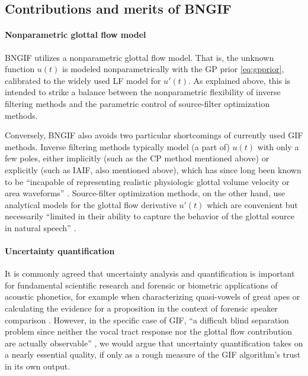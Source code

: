 \begin{chaptersections}
\subsection{Contributions and merits of BNGIF}

\paragraph{Nonparametric glottal flow model}
BNGIF utilizes a nonparametric glottal flow model.
That is, the unknown function $u(t)$ is modeled nonparametrically with the GP prior \eqref{eq:gpprior}, calibrated to the widely used LF model for $u'(t)$.
As explained above, this is intended to strike a balance between the nonparametric flexibility of inverse filtering methods and the parametric control of source-filter optimization methods.

Conversely, BNGIF also avoids two particular shortcomings of currently used GIF methods.
Inverse filtering methods typically model (a part of) $u(t)$ with only a few poles, either implicitly (such as the CP method mentioned above) or explicitly (such as IAIF, also mentioned above), which has since long been known to be ``incapable of representing realistic physiologic
glottal volume velocity or area waveforms'' \citep[][p.~62]{Deller1983}.
Source-filter optimization methods, on the other hand, use analytical models for the glottal flow derivative $u'(t)$ \citep{Doval2006} which are convenient but necessarily ``limited in their ability to capture the behavior of the glottal source in natural speech'' %
\citep[][p.~1926]{Kadiri2021}.


\paragraph{Uncertainty quantification}
It is commonly agreed that uncertainty analysis and quantification is important for fundamental scientific research and forensic or biometric applications of acoustic phonetics, for example when characterizing quasi-vowels of great apes \citep{Ekstrom2023} or calculating the evidence for a proposition in the context of forensic speaker comparison \citep{Bonastre2015}.
However, in the specific case of GIF, ``a difficult blind separation problem since neither the vocal tract response nor the glottal flow contribution are actually observable'' \citep[][p.~962]{Degottex2014}, we would argue that uncertainty quantification takes on a nearly essential quality, if only as a rough measure of the GIF algorithm's trust in its own output.


\end{chaptersections}
